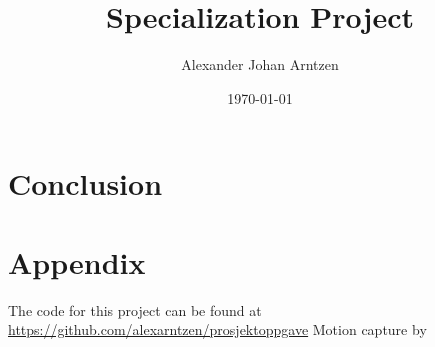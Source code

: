 \documentclass{article}
\title{Specialization Project}
\author{Alexander Johan Arntzen }
\date{\today}
\begin{document}
\maketitle
\tableofcontents

% 




\FloatBarrier

\section{Conclusion}

\section*{Appendix}
The code for this project can be found at \url{https://github.com/alexarntzen/prosjektoppgave}
Motion capture by 
\cite{mocap}
\printbibliography
\end{document}
